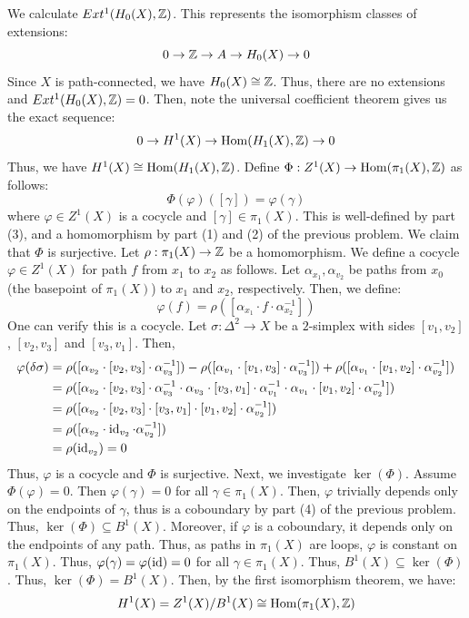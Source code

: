 \documentclass[12pt]{article}
\begin{document}
\begin{solution}
    We calculate $Ext^1(H_0(X), \mathbb Z)$. This represents the isomorphism classes of extensions: 
    \[ 0 \to \mathbb Z \to A \to H_0(X) \to 0 \]
    Since $X$ is path-connected, we have $H_0(X) \cong \mathbb Z$. Thus, there are no extensions and $Ext^1(H_0(X), \mathbb Z) = 0$. Then, note the universal coefficient theorem gives us the exact sequence: 
    \[ 0 \to H^1(X) \to \operatorname{Hom}(H_1(X), \mathbb Z) \to 0 \]
    Thus, we have $H^1(X) \cong \operatorname{Hom}(H_1(X), \mathbb Z)$. \bbni
    Define $\Phi: Z^1(X) \to \operatorname{Hom}(\pi_1(X), \mathbb Z)$ as follows:
    \[ \Phi(\varphi)([\gamma]) = \varphi(\gamma) \]
    where $\varphi \in Z^1(X)$ is a cocycle and $[\gamma] \in \pi_1(X)$. This is well-defined by part (3), and a homomorphism by part (1) and (2) of the previous problem. We claim that $\Phi$ is surjective. \bbni
    Let $\rho: \pi_1(X) \to \mathbb Z$ be a homomorphism. We define a cocycle $\varphi \in Z^1(X)$ for path $f$ from $x_1$ to $x_2$ as follows. Let $\alpha_{x_1}, \alpha_{v_2}$ be paths from $x_0$ (the basepoint of $\pi_1(X)$) to $x_1$ and $x_2$, respectively. Then, we define:
    \[ \varphi(f) = \rho([\alpha_{x_1} \cdot f \cdot \alpha_{x_2}^{-1}]) \]
    One can verify this is a cocycle. Let $\sigma: \Delta^2 \to X$ be a $2$-simplex with sides $[v_1, v_2]$, $[v_2, v_3]$ and $[v_3, v_1]$. Then, 
    \begin{align*}
        \varphi(\delta \sigma) &= \rho([\alpha_{v_2} \cdot [v_2, v_3] \cdot \alpha_{v_3}^{-1}]) - \rho([\alpha_{v_1} \cdot [v_1, v_3] \cdot \alpha_{v_3}^{-1}])+ \rho([\alpha_{v_1} \cdot [v_1, v_2] \cdot \alpha_{v_2}^{-1}]) \\
        &= \rho([\alpha_{v_2} \cdot [v_2, v_3] \cdot \alpha_{v_3}^{-1} \cdot \alpha_{v_3} \cdot [v_3, v_1] \cdot \alpha_{v_1}^{-1} \cdot \alpha_{v_1} \cdot [v_1, v_2] \cdot \alpha_{v_2}^{-1}])\\
        &= \rho([\alpha_{v_2} \cdot [v_2, v_3] \cdot [v_3, v_1] \cdot [v_1, v_2] \cdot \alpha_{v_2}^{-1}])\\
        &= \rho([\alpha_{v_2} \cdot \operatorname{id}_{v_2} \cdot \alpha_{v_2}^{-1}])\\
        &= \rho(\operatorname{id}_{v_2}) = 0
    \end{align*}
    Thus, $\varphi$ is a cocycle and $\Phi$ is surjective. \bbni
    Next, we investigate $\ker(\Phi)$. Assume $\Phi(\varphi) = 0$. Then $\varphi(\gamma) = 0$ for all $\gamma \in \pi_1(X)$. Then, $\varphi$ trivially depends only on the endpoints of $\gamma$, thus is a coboundary by part (4) of the previous problem. Thus, $\ker(\Phi) \subseteq B^1(X)$. Moreover, if $\varphi$ is a coboundary, it depends only on the endpoints of any path. Thus, as paths in $\pi_1(X)$ are loops, $\varphi$ is constant on $\pi_1(X)$. Thus, $\varphi(\gamma) = \varphi(\operatorname{id}) = 0$ for all $\gamma \in \pi_1(X)$. Thus, $B^1(X) \subseteq \ker(\Phi)$. Thus, $\ker(\Phi) = B^1(X)$. \bbni
    Then, by the first isomorphism theorem, we have:
    \[ H^1(X) = Z^1(X)/B^1(X) \cong \operatorname{Hom}(\pi_1(X), \mathbb Z) \]
\end{solution}
\newpage
\end{document}
